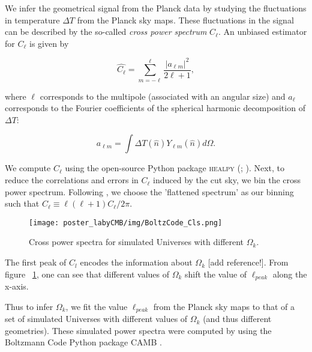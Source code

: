We infer the geometrical signal from the Planck data by studying the fluctuations in temperature $\Delta T$ from the Planck sky maps. These fluctuations in the signal can be described by the so-called \textit{cross power spectrum} $C_{\ell}$. An unbiased estimator for $C_{\ell}$ \cite{tristram:2005} is given by 

\begin{equation}
\widehat{C_{\ell}}=\sum_{m=-\ell}^{\ell} \frac{\left|a_{\ell m}\right|^{2}}{2 \ell+1},
\end{equation}
\vspace{1em}

where $\ell$ corresponds to the multipole (associated with an angular size) and $a_{\ell}$ corresponds to the Fourier coefficients of the spherical harmonic decomposition of $\Delta T$:

\begin{equation}
a_{\ell m}=\int \Delta T(\hat{n}) Y_{\ell m}(\hat{n}) d \Omega.
\end{equation}
\vspace{1em}

We compute $C_{\ell}$ using the open-source Python package \textsc{healpy} (\cite{healpy:2019}; \cite{healpix:2005}). Next, to reduce the correlations and errors in $C_{\ell}$ induced by the cut sky, we bin the cross power spectrum. Following \cite{hivon:2002}, we choose the 'flattened spectrum' as our binning such that $C_{\ell} \equiv \ell(\ell+1) C_{\ell} / 2 \pi$.


\vspace{0.8em}
\begin{figure}
	\begin{minipage}{.65\textwidth}
		\centering\texttt{[image: poster\_labyCMB/img/BoltzCode\_Cls.png]}
		\caption{Cross power spectra for simulated Universes with different $\Omega_k$.}
		\label{fig: boltz_Cls}
	\end{minipage}
\end{figure}
\vspace{0.8em}

The first peak of $C_l$ encodes the information about $\Omega_k$ [add reference!]. From figure ~\ref{fig: boltz_Cls}, one can see that different values of $\Omega_k$ shift the value of $\ell_{peak}$ along the x-axis.

Thus to infer $\Omega_k$, we fit the value $\ell_{peak}$ from the Planck sky maps to that of a set of simulated Universes with different values of $\Omega_k$ (and thus different geometries). These simulated power spectra were computed by using the Boltzmann Code Python package \textsc{CAMB} \cite{camb:2011}.
